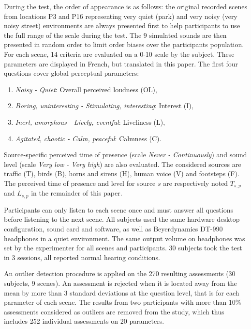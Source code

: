 \documentclass{article}
\begin{document}
\begin{sloppy}
During the test, the order of appearance is as follows: the original recorded scenes from locations P3 and P16 representing very quiet (park) and very noisy (very noisy street) environments are always presented first to help participants to use the full range of the scale during the test. The 9 simulated sounds are then presented in random order to limit order biases over the participants population. For each scene, 14 criteria are evaluated on a 0-10 scale by the subject. These parameters are displayed in French, but translated in this paper. The first four questions cover global perceptual parameters:
\begin{enumerate}
\item \textit{Noisy - Quiet}: Overall perceived loudness (OL),
\item \textit{Boring, uninteresting - Stimulating, interesting}: Interest (I),
\item \textit{Inert, amorphous - Lively, eventful}: Liveliness (L),
\item \textit{Agitated, chaotic - Calm, peaceful}: Calmness (C).
\end{enumerate}
Source-specific perceived time of presence (scale \textit{Never - Continuously}) and sound level (scale \textit{Very low - Very high}) are also evaluated. The considered sources are traffic (T), birds (B), horns and sirens (H), human voice (V) and footsteps (F). The perceived time of presence and level for source $s$ are respectively noted $T_{s,p}$ and $L_{s,p}$ in the remainder of this paper.

Participants can only listen to each scene once and must answer all questions before listening to the next scene. All subjects used the same hardware desktop configuration, sound card and software, as well as Beyerdynamics DT-990 headphones in a quiet environment. The same output volume on headphones was set by the experimenter for all scenes and participants. 30 subjects took the test in 3 sessions, all reported normal hearing conditions.

An outlier detection procedure is applied on the 270 resulting assessments (30 subjects, 9 scenes). An assessment is rejected when it is located away from the mean by more than 3 standard deviations at the question level, that is for each parameter of each scene. The results from two participants with more than 10\% assessments considered as outliers are removed from the study, which thus includes 252 individual assessments on 20 parameters.


\end{sloppy}
\end{document}
